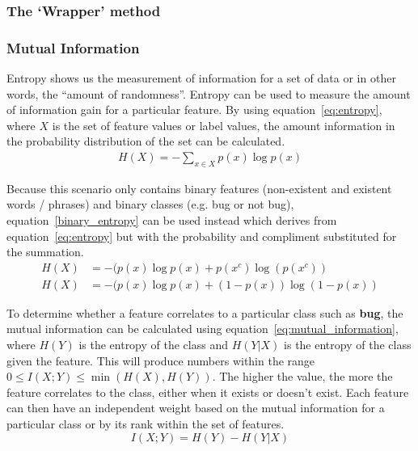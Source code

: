 \subsubsection{The `Wrapper' method}
\todo{}

\subsubsection{Mutual Information}
Entropy shows us the measurement of information for a set of data or in other words, the ``amount of randomness''. Entropy can
be used to measure the amount of information gain for a particular feature. By using equation~\ref{eq:entropy}, where $X$ is
the set of feature values or label values, the amount information in the probability distribution of the set can be calculated.
\begin{align}
	\label{eq:entropy}
	H(X) = -\sum_{x \in X} p(x) \log p(x)
\end{align}

Because this scenario only contains binary features (non-existent and existent words / phrases) and binary classes
(e.g. bug or not bug), equation~\ref{binary_entropy} can be used instead which derives from equation~\ref{eq:entropy} but with
the probability and compliment substituted for the summation.
\begin{equation}
	\label{eq:binary_entropy}
	\begin{split}
		H(X) &= -(p(x) \log p(x) + p(x^c)     \log(p(x^c))   \\
		H(X) &= -(p(x) \log p(x) + (1 - p(x)) \log(1 - p(x))
	\end{split}
\end{equation}

To determine whether a feature correlates to a particular class such as \textbf{bug}, the mutual information can be calculated
using equation~\ref{eq:mutual_information}, where $H(Y)$ is the entropy of the class and $H(Y|X)$ is the entropy of the class
given the feature. This will produce numbers within the range $0 \leq I(X;Y) \leq \min(H(X), H(Y))$. The higher the value, the
more the feature correlates to the class, either when it exists or doesn't exist. Each feature can then have an independent
weight based on the mutual information for a particular class or by its rank within the set of features.
\begin{equation}
	\label{eq:mutual_information}
	I(X;Y) = H(Y) - H(Y|X)
\end{equation}

